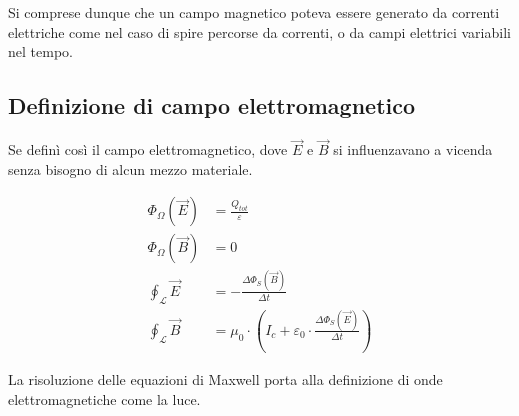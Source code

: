 Si comprese dunque che un campo magnetico poteva essere generato da correnti elettriche come nel caso di spire percorse da correnti, o da campi elettrici variabili nel tempo.

\subsection{Definizione di campo elettromagnetico}

Se definì così il campo elettromagnetico, dove $\vec{E}$ e $\vec{B}$ si influenzavano a vicenda senza bisogno di alcun mezzo materiale.

\begin{align*}
    \Phi_\Omega(\vec{E})        & = \frac{Q_{tot}}{\varepsilon}                                                                  \\
    \Phi_\Omega(\vec{B})        & = 0                                                                                            \\
    \oint_{\mathcal{L}} \vec{E} & = - \frac{\Delta \Phi_S(\vec{B})}{\Delta t}                                                    \\
    \oint_{\mathcal{L}} \vec{B} & = \mu_0 \cdot \left( I_c + \varepsilon_0 \cdot \frac{\Delta \Phi_S(\vec{E})}{\Delta t} \right)
\end{align*}

La risoluzione delle equazioni di Maxwell porta alla definizione di onde elettromagnetiche come la luce.
